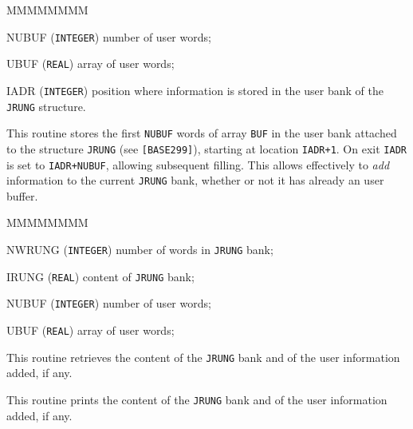   


\begin{DLtt}{MMMMMMMM}
\item[NUBUF] ({\tt INTEGER}) number of user words;
\item[UBUF] ({\tt REAL}) array of user words;
\item[IADR] ({\tt INTEGER}) position where information is stored in the
user bank of the {\tt JRUNG} structure.
\end{DLtt}

This routine stores the first {\tt NUBUF} words of array {\tt BUF} in the
user bank attached to the structure {\tt JRUNG} (see {\tt [BASE299]}),
starting at location {\tt IADR+1}.
On exit {\tt IADR} is set to {\tt IADR+NUBUF}, allowing subsequent filling. 
This allows effectively 
to {\it add} information to the current {\tt JRUNG} bank, whether or not it has 
already an user buffer.

\begin{DLtt}{MMMMMMMM}
\item[NWRUNG] ({\tt INTEGER}) number of words in {\tt JRUNG} bank;
\item[IRUNG] ({\tt REAL}) content of {\tt JRUNG} bank;
\item[NUBUF] ({\tt INTEGER}) number of user words;
\item[UBUF] ({\tt REAL}) array of user words;
\end{DLtt}

This routine retrieves the content of the {\tt JRUNG} bank and of the
user information added, if any.


This routine prints the content of the {\tt JRUNG} bank and of the
user information added, if any.

